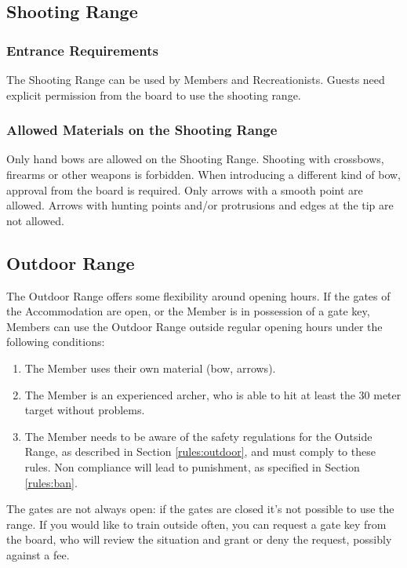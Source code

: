 \documentclass[a4paper]{article}
\begin{document}
\subsection{Shooting Range}
\subsubsection{Entrance Requirements}
The Shooting Range can be used by Members and Recreationists. Guests need explicit permission from the board to use the shooting range. 

\subsubsection{Allowed Materials on the Shooting Range}
Only hand bows are allowed on the Shooting Range. Shooting with crossbows, firearms or other weapons is forbidden. When introducing a different kind of bow, approval from the board is required. Only arrows with a smooth point are allowed. Arrows with hunting points and/or protrusions and edges at the tip are not allowed.

\subsection{Outdoor Range}
\label{section:outdoor}
The Outdoor Range offers some flexibility around opening hours. If the gates of the Accommodation are open, or the Member is in possession of a gate key, Members can use the Outdoor Range outside regular opening hours under the following conditions:

\begin{enumerate}
\item The Member uses their own material (bow, arrows).
\item The Member is an experienced archer, who is able to hit at least the 30 meter target without problems.
\item The Member needs to be aware of the safety regulations for the Outside Range, as described in Section \ref{rules:outdoor}, and must comply to these rules. Non compliance will lead to punishment, as specified in Section \ref{rules:ban}.
\end{enumerate}

The gates are not always open: if the gates are closed it’s not possible to use the range. If you would like to train outside often, you can request a gate key from the board, who will review the situation and grant or deny the request, possibly against a fee. \\
\end{document}
